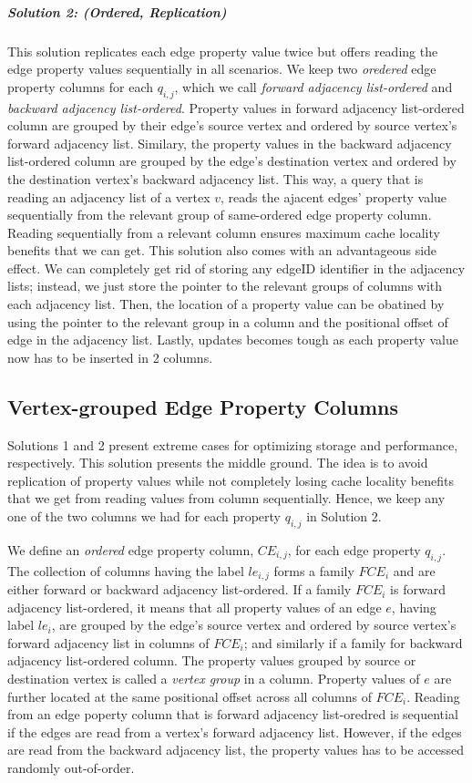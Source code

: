 \vspace{-12pt}

\subparagraph{Solution 2: (Ordered, Replication) } This solution replicates each edge property value twice but offers reading the edge property values sequentially in all scenarios. We keep two \emph{oredered} edge property columns for each $q_{i,j}$, which we call \emph{forward adjacency list-ordered} and \emph{backward adjacency list-ordered}. Property values in forward adjacency list-ordered column are grouped by their edge's source vertex and ordered by source vertex's forward adjacency list. Similary, the property values in the backward adjacency list-ordered column are grouped by the edge's destination vertex and ordered by the destination vertex's backward adjacency list. This way, a query that is reading an adjacency list of a vertex $v$, reads the ajacent edges' property value sequentially from the relevant group of same-ordered edge property column. Reading sequentially from a relevant column ensures maximum cache locality benefits that we can get. This solution also comes with an advantageous side effect. We can completely get rid of storing any edgeID identifier in the adjacency lists; instead, we just store the pointer to the relevant groups of columns with each adjacency list. Then, the location of a property value can be obatined by using the pointer to the relevant group in a column and the positional offset of edge in the adjacency list. Lastly, updates becomes tough as each property value now has to be inserted in 2 columns.

\subsection{Vertex-grouped Edge Property Columns}

Solutions 1 and 2 present extreme cases for optimizing storage and performance, respectively. This solution presents the middle ground. The idea is to avoid replication of property values while not completely losing cache locality benefits that we get from reading values from column sequentially. Hence, we keep any one of the two columns we had for each property $q_{i,j}$ in Solution 2.

We define an \emph{ordered} edge property column, $CE_{i,j}$, for each edge property $q_{i,j}$. The collection of columns having the label $le_{i,j}$ forms a family $FCE_i$ and are either forward or backward adjacency list-ordered. If a family $FCE_i$ is forward adjacency list-ordered, it means that all property values of an edge $e$, having label $le_i$, are grouped by the edge's source vertex and ordered by source vertex's forward adjacency list in columns of $FCE_i$; and similarly if a family for backward adjacency list-ordered column. The property values grouped by source or destination vertex is called a \emph{vertex group} in a column. Property values of $e$ are further located at the same positional offset across all columns of $FCE_i$. Reading from an edge poperty column that is forward adjacency list-oredred is sequential if the edges are read from a vertex's forward adjacency list. However, if the edges are read from the backward adjacency list, the property values has to be accessed randomly out-of-order.

